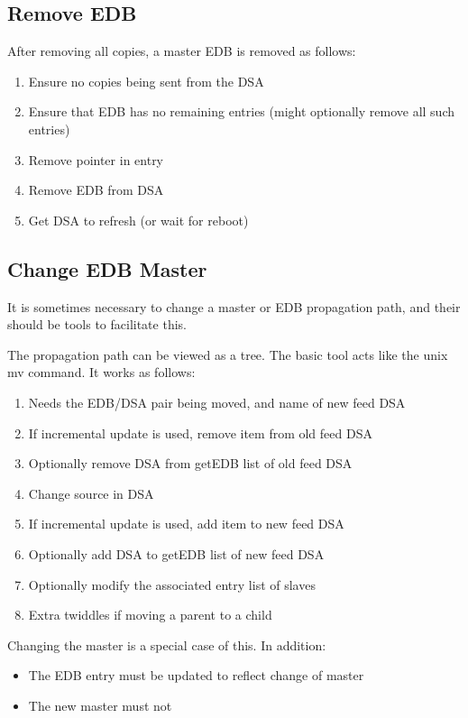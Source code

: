 \subsection {Remove EDB}

After removing all copies, a master EDB is removed as follows:

\begin {enumerate}
\item Ensure no copies being sent from the DSA
\item Ensure that EDB has no remaining entries (might optionally
remove all such entries)
\item Remove pointer in entry
\item Remove EDB from DSA
\item Get DSA to refresh (or wait for reboot)
\end {enumerate}

\subsection {Change EDB Master}

It is sometimes necessary to change a master or EDB propagation path, and
their should be tools to facilitate this.

The propagation path can be viewed as a tree.  The basic tool acts like the
unix mv command.  It works as follows:

\begin {enumerate}
\item Needs the EDB/DSA pair being moved, and name of new feed DSA
\item If incremental update is used, remove item from old feed DSA
\item Optionally remove DSA from getEDB list of old feed DSA
\item Change source in DSA
\item If incremental update is used, add item to new feed DSA
\item Optionally add DSA to getEDB list of new feed DSA
\item Optionally modify the associated entry list of slaves
\item Extra twiddles if moving a parent to a child
\end {enumerate}

Changing the master is a special case of this.  In addition:
\begin {itemize}
\item The EDB entry must be updated to reflect change of master
\item The new master must not
\end {itemize}


